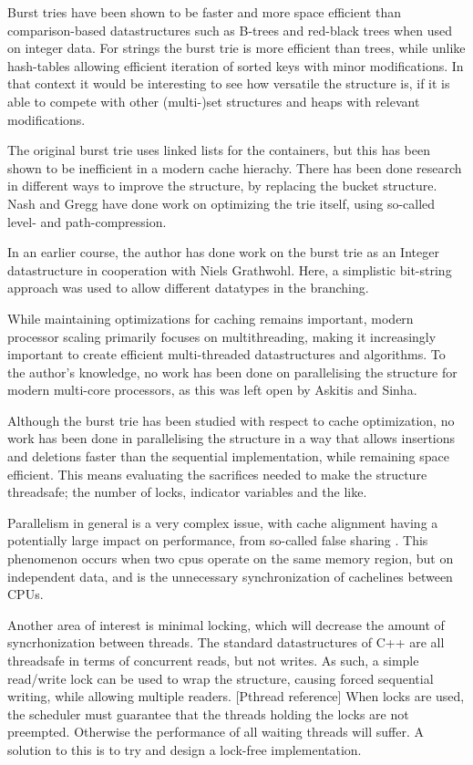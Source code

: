 Burst tries have been shown to be faster and more space efficient than
compari\-son-based datastructures such as B-trees and red-black trees when used
on integer data. For strings the burst trie is more efficient than trees, while
unlike hash-tables allowing efficient iteration of sorted keys with minor
modifications. In that context it would be interesting to see how versatile the
structure is, if it is able to compete with other {\keyword (multi-)set}
structures and heaps with relevant modifications.

The original burst trie uses linked lists for the containers, but this has been
shown to be inefficient in a modern cache hierachy. There has been done research
in different ways to improve the structure, by replacing the bucket structure.
Nash and Gregg have done work on optimizing the trie itself, using so-called
level- and path-compression.\cite{Nash:2008}

In an earlier course, the author has done work on the burst trie as an Integer
datastructure in cooperation with Niels Grathwohl. Here, a simplistic
bit-string approach was used to allow different datatypes in the
branching.\cite{Wejendorp:2010}

While maintaining optimizations for caching remains important, modern processor
scaling primarily focuses on multithreading, making it increasingly important
to create efficient multi-threaded datastructures and algorithms.
To the author's knowledge, no work has been done on parallelising the structure
for modern multi-core processors, as this was left open by Askitis and Sinha.
\cite{Askitis:2010}

Although the burst trie has been studied with respect to cache optimization, no
work has been done in parallelising the structure in a way that allows
insertions and deletions faster than the sequential implementation, while
remaining space efficient\cite{Askitis:2010}. This means evaluating the
sacrifices needed to make the structure threadsafe; the number of locks,
indicator variables and the like.

Parallelism in general is a very complex issue, with cache alignment having a
potentially large impact on performance, from so-called false sharing
\cite{Shavit:2011}. This phenomenon occurs when two cpus operate on the same
memory region, but on independent data, and is the unnecessary synchronization
of cachelines between CPUs.

Another area of interest is minimal locking, which will decrease the amount of
syncrhonization between threads. The standard datastructures of C++ are all
threadsafe in terms of concurrent reads, but not writes. As such, a simple
read/write lock can be used to wrap the structure, causing forced sequential
writing, while allowing multiple readers. [Pthread reference] When locks are
used, the scheduler must guarantee that the threads holding the locks are not
preempted. Otherwise the performance of all waiting threads will suffer. A
solution to this is to try and design a lock-free implementation.

